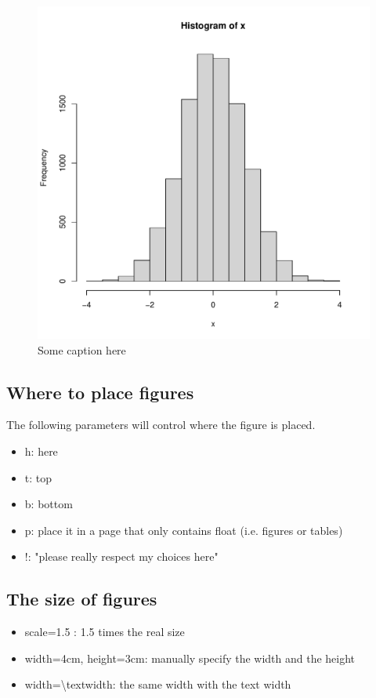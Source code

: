 \documentclass[11pt]{article}
\theoremstyle{quest}
\begin{document}
\begin{figure}[h!]  %
\centering %
\includegraphics[scale=0.3]{figs/normal.pdf} %
\caption{ %
  Some caption here
}
\label{fig:normal} %
\end{figure}

\subsection{Where to place figures}
The following parameters will control where the figure is placed.
\begin{itemize}
  \item h: here 
  \item t: top 
  \item b: bottom 
  \item p: place it in a page that only contains float (i.e. figures or tables)
  \item !: "please really respect my choices here" 
\end{itemize}

\subsection{The size of figures}
\begin{itemize}
  \item scale=1.5 : 1.5 times the real size 
  \item width=4cm, height=3cm: manually specify the width and the height 
  \item width=\textbackslash textwidth: the same width with the text width 
\end{itemize}
\end{document}
